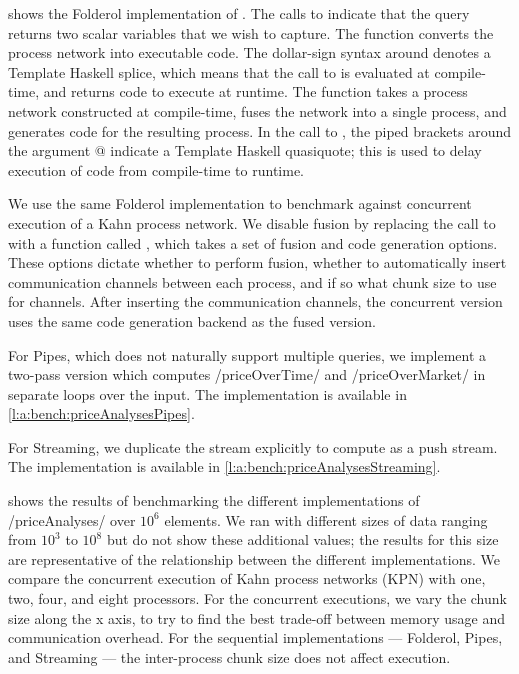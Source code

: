  shows the Folderol implementation of \Hs@priceAnalyses@.
The calls to \Hs@scalarIO@ indicate that the query returns two scalar variables that we wish to capture.
The \Hs@fuse@ function converts the process network into executable code.
The dollar-sign syntax around \Hs@fuse@ denotes a Template Haskell splice, which means that the call to \Hs@fuse@ is evaluated at compile-time, and returns code to execute at runtime.
The \Hs@fuse@ function takes a process network constructed at compile-time, fuses the network into a single process, and generates code for the resulting process.
In the call to \Hs@source@, the piped brackets around the argument @ indicate a Template Haskell quasiquote; this is used to delay execution of code from compile-time to runtime.

We use the same Folderol implementation to benchmark against concurrent execution of a Kahn process network.
We disable fusion by replacing the call to \Hs@fuse@ with a function called \Hs@fuseWith@, which takes a set of fusion and code generation options.
These options dictate whether to perform fusion, whether to automatically insert communication channels between each process, and if so what chunk size to use for channels.
After inserting the communication channels, the concurrent version uses the same code generation backend as the fused version.

For Pipes, which does not naturally support multiple queries, we implement a two-pass version which computes \Hs/priceOverTime/ and \Hs/priceOverMarket/ in separate loops over the input.
The implementation is available in \cref{l:a:bench:priceAnalysesPipes}.

For Streaming, we duplicate the stream explicitly to compute \Hs@priceOverTime@ as a push stream.
The implementation is available in \cref{l:a:bench:priceAnalysesStreaming}.



 shows the results of benchmarking the different implementations of \Hs/priceAnalyses/ over $10^6$ elements.
We ran with different sizes of data ranging from $10^3$ to $10^8$ but do not show these additional values; the results for this size are representative of the relationship between the different implementations.
We compare the concurrent execution of Kahn process networks (KPN) with one, two, four, and eight processors.
For the concurrent executions, we vary the chunk size along the x axis, to try to find the best trade-off between memory usage and communication overhead.
For the sequential implementations --- Folderol, Pipes, and Streaming --- the inter-process chunk size does not affect execution.

